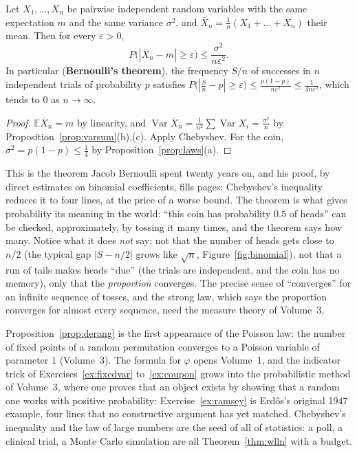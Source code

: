 \begin{theorem}\label{thm:wlln}
Let $X_1,\dots,X_n$ be pairwise independent random variables with the same expectation $m$ and the same variance $\sigma^2$, and $\overline X_n=\frac1n(X_1+\dots+X_n)$ their mean. Then for every $\varepsilon>0$,
\[
P\big(|\overline X_n-m|\ge\varepsilon\big)\le\frac{\sigma^2}{n\varepsilon^2}.
\]
In particular (\textbf{Bernoulli's theorem}), the frequency $S/n$ of successes in $n$ independent trials of probability $p$ satisfies $P\big(\left|\frac Sn-p\right|\ge\varepsilon\big)\le\frac{p(1-p)}{n\varepsilon^2}\le\frac1{4n\varepsilon^2}$, which tends to $0$ as $n\to\infty$.
\end{theorem}
\begin{proof}
$\mathbb E\overline X_n=m$ by linearity, and $\operatorname{Var}\overline X_n=\frac1{n^2}\sum\operatorname{Var}X_i=\frac{\sigma^2}n$ by Proposition~\ref{prop:varsum}(b),(c). Apply Chebyshev. For the coin, $\sigma^2=p(1-p)\le\frac14$ by Proposition~\ref{prop:laws}(a).
\end{proof}

This is the theorem Jacob Bernoulli spent twenty years on, and his proof, by direct estimates on binomial coefficients, fills pages; Chebyshev's inequality reduces it to four lines, at the price of a worse bound. The theorem is what gives probability its meaning in the world: ``this coin has probability $0.5$ of heads'' can be checked, approximately, by tossing it many times, and the theorem says how many. Notice what it does \emph{not} say: not that the number of heads gets close to $n/2$ (the typical gap $|S-n/2|$ grows like $\sqrt n$, Figure~\ref{fig:binomial}), not that a run of tails makes heads ``due'' (the trials are independent, and the coin has no memory), only that the \emph{proportion} converges. The precise sense of ``converges'' for an infinite sequence of tosses, and the strong law, which says the proportion converges for almost every sequence, need the measure theory of Volume~3.

\begin{beauty}
Proposition~\ref{prop:derang} is the first appearance of the Poisson law: the number of fixed points of a random permutation converges to a Poisson variable of
parameter $1$ (Volume~3). The formula for $\varphi$ opens Volume~1, and the indicator trick of Exercises~\ref{ex:fixedvar} to~\ref{ex:coupon} grows into the probabilistic
method of Volume~3, where one proves that an object exists by showing that a random one works with positive probability: Exercise~\ref{ex:ramsey} is Erd\H os's original 1947 example, four lines that no constructive argument has yet matched. Chebyshev's inequality and the law of large numbers are the seed of all of statistics: a poll, a clinical trial, a Monte Carlo simulation are all Theorem~\ref{thm:wlln} with a budget.
\end{beauty}

